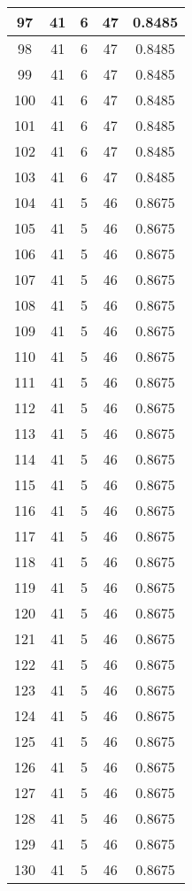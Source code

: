 \documentclass[letterpaper, 12pt]{article}
\begin{document}
\begin{longtable}{|c|c|c|c|c|}
\hline
97 & 41 & 6 & 47 & 0.8485 \\
\hline
98 & 41 & 6 & 47 & 0.8485 \\
\hline
99 & 41 & 6 & 47 & 0.8485 \\
\hline
100 & 41 & 6 & 47 & 0.8485 \\
\hline
101 & 41 & 6 & 47 & 0.8485 \\
\hline
102 & 41 & 6 & 47 & 0.8485 \\
\hline
103 & 41 & 6 & 47 & 0.8485 \\
\hline
104 & 41 & 5 & 46 & 0.8675 \\
\hline
105 & 41 & 5 & 46 & 0.8675 \\
\hline
106 & 41 & 5 & 46 & 0.8675 \\
\hline
107 & 41 & 5 & 46 & 0.8675 \\
\hline
108 & 41 & 5 & 46 & 0.8675 \\
\hline
109 & 41 & 5 & 46 & 0.8675 \\
\hline
110 & 41 & 5 & 46 & 0.8675 \\
\hline
111 & 41 & 5 & 46 & 0.8675 \\
\hline
112 & 41 & 5 & 46 & 0.8675 \\
\hline
113 & 41 & 5 & 46 & 0.8675 \\
\hline
114 & 41 & 5 & 46 & 0.8675 \\
\hline
115 & 41 & 5 & 46 & 0.8675 \\
\hline
116 & 41 & 5 & 46 & 0.8675 \\
\hline
117 & 41 & 5 & 46 & 0.8675 \\
\hline
118 & 41 & 5 & 46 & 0.8675 \\
\hline
119 & 41 & 5 & 46 & 0.8675 \\
\hline
120 & 41 & 5 & 46 & 0.8675 \\
\hline
121 & 41 & 5 & 46 & 0.8675 \\
\hline
122 & 41 & 5 & 46 & 0.8675 \\
\hline
123 & 41 & 5 & 46 & 0.8675 \\
\hline
124 & 41 & 5 & 46 & 0.8675 \\
\hline
125 & 41 & 5 & 46 & 0.8675 \\
\hline
126 & 41 & 5 & 46 & 0.8675 \\
\hline
127 & 41 & 5 & 46 & 0.8675 \\
\hline
128 & 41 & 5 & 46 & 0.8675 \\
\hline
129 & 41 & 5 & 46 & 0.8675 \\
\hline
130 & 41 & 5 & 46 & 0.8675 \\

\end{longtable}
\end{document}
